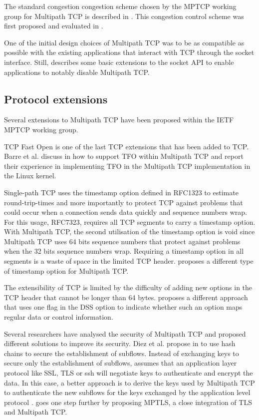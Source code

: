 The standard congestion congestion scheme chosen by the MPTCP working group for Multipath TCP is described in \cite{rfc6356}. This congestion control scheme was first proposed and evaluated in \cite{Wischik_Design:2011}.

One of the initial design choices of Multipath TCP was to be as compatible as possible with the existing applications that interact with TCP through the socket interface. Still, \cite{rfc6897} describes some basic extensions to the socket API to enable applications to notably disable Multipath TCP.  


\subsection{Protocol extensions}

Several extensions to Multipath TCP have been proposed within the IETF MPTCP working group. 

TCP Fast Open is one of the last TCP extensions that has been added to TCP. Barre et al. discuss
in \cite{draft-barre-mptcp-tfo} how to support TFO within Multipath TCP and report their experience in implementing TFO in the Multipath TCP implementation in the Linux kernel.

Single-path TCP uses the timestamp option defined in RFC1323 to estimate round-trip-times and more importantly to protect TCP against problems that could occur when a connection sends data
quickly and sequence numbers wrap. For this usage, RFC7323, requires all TCP segments to carry a timestamp option. With
Multipath TCP, the second utilisation of the timestamp option is
void since Multipath TCP uses 64 bits sequence numbers that protect against problems when the 32 bits sequence numbers wrap. Requiring a timestamp option in all segments is a waste of space
in the limited TCP header. \cite{draft-bonaventure-mptcp-timestamp} proposes a different
type of timestamp option for Multipath TCP.

The extensibility of TCP is limited by the difficulty of adding new options in the TCP header that cannot be longer than 64 bytes. \cite{draft-paasch-mptcp-control-stream} proposes a different approach that uses one flag in the DSS option to 
indicate whether such an option maps regular data or control information. 

Several researchers have analysed the security of Multipath TCP
and proposed different solutions to improve its security. 
Diez et al. propose in \cite{Diez_Security:2011} to use hash chains to secure the establishment of subflows. Instead of exchanging keys to secure only the establishment of subflows, \cite{draft-paasch-mptcp-ssl} assumes that an application layer protocol like SSL, TLS or ssh will negotiate keys to authenticate and encrypt the data. In this case, a better
approach is to derive the keys used by Multipath TCP to authenticate the new subflows for the keys exchanged by the
application level protocol \cite{draft-paasch-mptcp-ssl}. 
\cite{draft-bonaventure-mptcp-tls} goes one step further by
proposing MPTLS, a close integration of TLS and Multipath TCP. 

